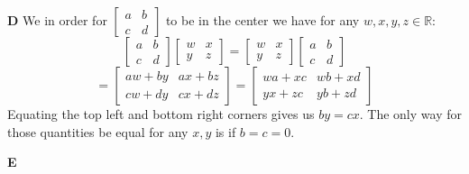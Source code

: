 \documentclass[12pt]{article}
\newenvironment{ques}{\vspace{2 ex}}{\vspace{2 ex}}
\theoremstyle{definition}
\begin{document}
\begin{ques}
	\textbf{D}
		We in order for $\left[\begin{array}{cc} a & b \\ c & d
		\end{array}\right]$ to be in the center we have for any $w,x,y,z
		\in \mathbb R$:
		$$\left[\begin{array}{cc} a & b \\ c &
		d \end{array}\right]\left[\begin{array}{cc} w &
		x \\ y & z \end{array}\right] =
		\left[\begin{array}{cc} w & x \\ y & z
		\end{array}\right]\left[\begin{array}{cc}
		a & b \\ c & d \end{array}\right]$$
		$$= \left[\begin{array}{cc} aw + by & ax + bz
		\\ cw + dy & cx + dz \end{array}\right] =
		\left[\begin{array}{cc} wa + xc & wb + xd
		\\ yx + zc & yb + zd \end{array}\right] $$
		Equating the top left and bottom right corners gives us $by =
		cx$. The only way for those quantities be equal for any $x,y$ is if
		$b= c= 0$.
\end{ques}

\begin{ques}
	\textbf{E}
\end{ques}
\end{document}
